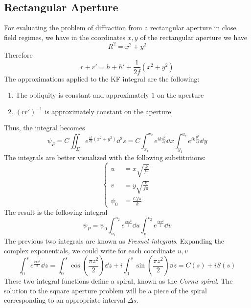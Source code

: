 \documentclass[../electromagnetism.tex]{subfiles}
\begin{document}
\subsection{Rectangular Aperture}
For evaluating the problem of diffraction from a rectangular aperture in close field regimes, we have in the coordinates $x, y$ of the rectangular aperture we have
\begin{equation*}
	R^2=x^2+y^2
\end{equation*}
Therefore
\begin{equation*}
	r+r'=h+h'+\frac{1}{2f}\left( x^2+y^2 \right)
\end{equation*}
The approximations applied to the KF integral are the following:
\begin{enumerate}
\item The obliquity is constant and approximately 1 on the aperture
\item $(rr')^{-1}$ is approximately constant on the aperture
\end{enumerate}
Thus, the integral becomes
\begin{equation}
	\psi_P=C\iint_\Sigma e^{\frac{ik}{2f}\left( x^2+y^2 \right)}\dd^2s=C\int_{x_1}^{x_2}e^{ik\frac{x^2}{2f}}\dd^{}{x}\int_{y_1}^{y_2}e^{ik\frac{y^2}{2f}}\dd^{}{y}
	\label{eq:fresnelkfsquare.diff}
\end{equation}
The integrals are better visualized with the following substitutions:
\begin{equation*}
	\left\{\begin{aligned}
		u&= x\sqrt{\frac{k}{f\pi}}\\
		v&= y\sqrt{\frac{k}{f\pi}}\\
		\psi_0&= \frac{Cf\pi}{k}
	\end{aligned}\right.
\end{equation*}
The result is the following integral
\begin{equation}
	\psi_P=\psi_0\int_{u_1}^{u_2}e^{\frac{i\pi u^2}{2}}\dd{u}\int_{v_1}^{v_2}e^{\frac{i\pi v^2}{2}}\dd^{}{v}
	\label{eq:integralsquarefr.diff}
\end{equation}
The previous two integrals are known as \textit{Fresnel integrals}. Expanding the complex exponentials, we could write for each coordinate $u, v$
\begin{equation}
	\int_{0}^{s}e^{\frac{i\pi z^2}{2}}\dd^{}{z}=\int_{0}^{s}\cos\left( \frac{\pi z^2}{2} \right)\dd^{}{z}+i\int_{0}^{s}\sin\left( \frac{\pi z^2}{2} \right)\dd^{}{z}=C(s)+iS(s)
	\label{eq:fresnelintegrals.diff}
\end{equation}
These two integral functions define a spiral, known as the \textit{Cornu spiral}. The solution to the square aperture problem will be a piece of the spiral corresponding to an appropriate interval $\Delta s$.\\
\end{document}
